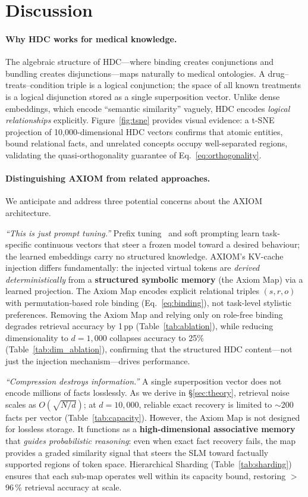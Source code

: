 \documentclass[11pt,a4paper]{article}
\begin{document}
\section{Discussion}
\label{sec:discussion}

\paragraph{Why HDC works for medical knowledge.}
The algebraic structure of HDC---where binding creates conjunctions and
bundling creates disjunctions---maps naturally to medical ontologies.  A
drug--treats--condition triple is a logical conjunction; the space of
all known treatments is a logical disjunction stored as a single
superposition vector.  Unlike dense embeddings, which encode ``semantic
similarity'' vaguely, HDC encodes \emph{logical relationships} explicitly.
Figure~\ref{fig:tsne} provides visual evidence: a t-SNE projection of
10,000-dimensional HDC vectors confirms that atomic entities, bound
relational facts, and unrelated concepts occupy well-separated regions,
validating the quasi-orthogonality guarantee of Eq.~\eqref{eq:orthogonality}.

\paragraph{Distinguishing AXIOM from related approaches.}
We anticipate and address three potential concerns about the AXIOM
architecture.

\emph{``This is just prompt tuning.''}
Prefix tuning~\citep{li2021prefix} and soft prompting learn
task-specific continuous vectors that steer a frozen model toward a
desired behaviour; the learned embeddings carry no structured
knowledge.  AXIOM's KV-cache injection differs fundamentally: the
injected virtual tokens are \emph{derived deterministically} from a
\textbf{structured symbolic memory} (the Axiom Map) via a learned
projection.  The Axiom Map encodes explicit relational triples
$(s, r, o)$ with permutation-based role binding
(Eq.~\eqref{eq:binding}), not task-level stylistic preferences.
Removing the Axiom Map and relying only on role-free binding
degrades retrieval accuracy by 1\,pp
(Table~\ref{tab:ablation}), while reducing dimensionality to
$d = 1{,}000$ collapses accuracy to 25\%
(Table~\ref{tab:dim_ablation}), confirming that the structured HDC
content---not just the injection mechanism---drives performance.

\emph{``Compression destroys information.''}
A single superposition vector does not encode millions of facts
losslessly.  As we derive in \S\ref{sec:theory}, retrieval noise
scales as $O(\sqrt{N/d})$; at $d = 10{,}000$, reliable exact
recovery is limited to $\sim$200 facts per vector
(Table~\ref{tab:capacity}).  However, the Axiom Map is not designed
for lossless storage.  It functions as a \textbf{high-dimensional
associative memory} that \emph{guides probabilistic reasoning}:
even when exact fact recovery fails, the map provides a graded
similarity signal that steers the SLM toward factually supported
regions of token space.  Hierarchical Sharding
(Table~\ref{tab:sharding}) ensures that each sub-map operates well
within its capacity bound, restoring $>$96\,\% retrieval accuracy at
scale.
\end{document}
